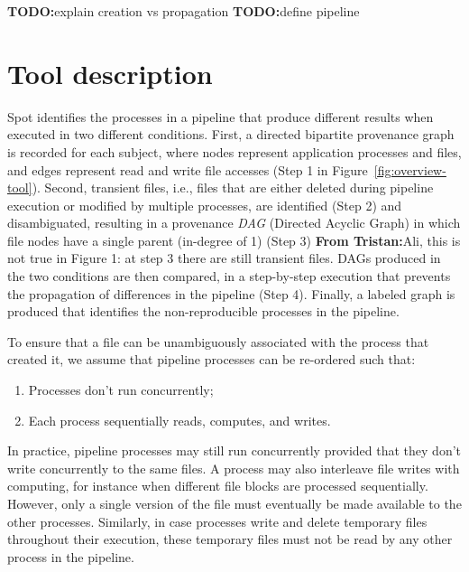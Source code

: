 \documentclass[a4paper,num-refs]{oup-contemporary}
\newcommand{\todo}[1]{\color{red}\textbf{TODO:}#1\color{black}}
\newcommand{\tristan}[1]{\color{blue}\textbf{From Tristan:}#1\color{black}}
\newcommand{\toolname}[0]{Spot\xspace}
\begin{document}
\todo{explain creation vs propagation}
\todo{define pipeline}

\section{Tool description}

\toolname identifies the processes in a pipeline that produce different
results when executed in two different conditions. First, a directed
bipartite provenance graph is recorded for each subject, where nodes
represent application processes and files, and edges represent read and
write file accesses (Step 1 in Figure~\ref{fig:overview-tool}). Second,
transient files, i.e., files that are either deleted during pipeline
execution or modified by multiple processes, are identified (Step 2) and
disambiguated, resulting in a provenance \emph{DAG} (Directed Acyclic
Graph) in which file nodes have a single parent (in-degree of 1) (Step 3)
\tristan{Ali, this is not true in Figure 1: at step 3 there are still
transient files}. DAGs produced in the two conditions are then compared, in
a step-by-step execution that prevents the propagation of differences in the pipeline (Step
4). Finally, a labeled graph is produced that identifies the
non-reproducible processes in the pipeline. 


To ensure that a file can be unambiguously associated with the process that
created it, we assume that pipeline processes can be re-ordered such that:
\begin{enumerate}
\item Processes don't run concurrently;
\item Each process sequentially reads, computes, and writes. 
\end{enumerate}
In practice, pipeline processes may still run concurrently provided that
they don't write concurrently to the same files. A process may also
interleave file writes with computing, for instance when different file
blocks are processed sequentially. However, only a single version of the
file must eventually be made available to the other processes. Similarly,
in case processes write and delete temporary files throughout their
execution, these temporary files must not be read by any other process in
the pipeline.
\end{document}
